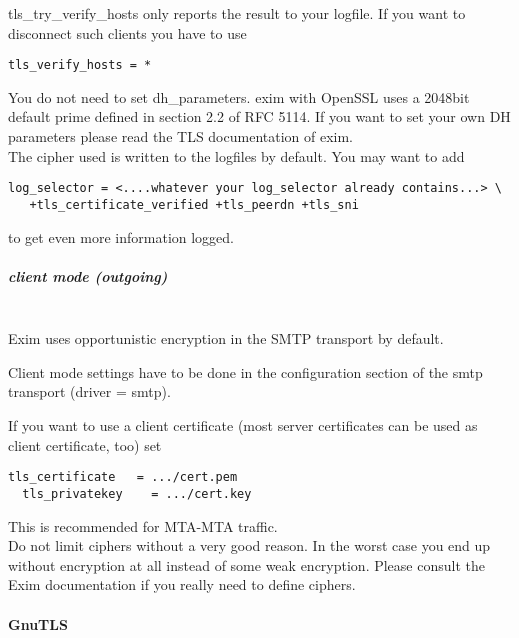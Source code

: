 tls\_try\_verify\_hosts only reports the result to your logfile. If you want to disconnect such clients you have to use
\begin{lstlisting}[breaklines]
  tls_verify_hosts = *
\end{lstlisting}

You do not need to set dh\_parameters. exim with OpenSSL uses a 2048bit default prime defined in section 2.2 of RFC 5114.
If you want to set your own DH parameters please read the TLS documentation of exim.\\

The cipher used is written to the logfiles by default. You may want to add
\begin{lstlisting}[breaklines]
  log_selector = <....whatever your log_selector already contains...> \
   +tls_certificate_verified +tls_peerdn +tls_sni
\end{lstlisting}
to get even more information logged.

\subparagraph*{client mode (outgoing)}\mbox{}\\

Exim uses opportunistic encryption in the SMTP transport by default.

Client mode settings have to be done in the configuration section of the smtp transport (driver = smtp).

If you want to use a client certificate (most server certificates can be used as client certificate, too) set
\begin{lstlisting}[breaklines]
  tls_certificate   = .../cert.pem
  tls_privatekey    = .../cert.key
\end{lstlisting}
This is recommended for MTA-MTA traffic.\\

Do not limit ciphers without a very good reason. In the worst case you end up without encryption at all instead of some weak encryption. Please consult the Exim documentation if you really need to define ciphers.

\paragraph*{GnuTLS}\mbox{}\\

